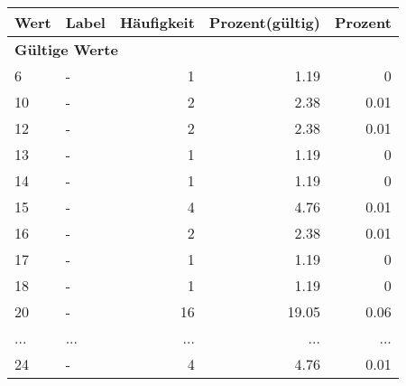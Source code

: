      \begin{longtable}{lXrrr}
     \toprule
     \textbf{Wert} & \textbf{Label} & \textbf{Häufigkeit} & \textbf{Prozent(gültig)} & \textbf{Prozent} \\
     \endhead
     \midrule
     \multicolumn{5}{l}{\textbf{Gültige Werte}}\\
        6 & \multicolumn{1}{X}{-} & %
          \num{1} &
          \num[round-mode=places,round-precision=2]{1.19} &
          \num[round-mode=places,round-precision=2]{0} \\
        10 & \multicolumn{1}{X}{-} & %
          \num{2} &
          \num[round-mode=places,round-precision=2]{2.38} &
          \num[round-mode=places,round-precision=2]{0.01} \\
        12 & \multicolumn{1}{X}{-} & %
          \num{2} &
          \num[round-mode=places,round-precision=2]{2.38} &
          \num[round-mode=places,round-precision=2]{0.01} \\
        13 & \multicolumn{1}{X}{-} & %
          \num{1} &
          \num[round-mode=places,round-precision=2]{1.19} &
          \num[round-mode=places,round-precision=2]{0} \\
        14 & \multicolumn{1}{X}{-} & %
          \num{1} &
          \num[round-mode=places,round-precision=2]{1.19} &
          \num[round-mode=places,round-precision=2]{0} \\
        15 & \multicolumn{1}{X}{-} & %
          \num{4} &
          \num[round-mode=places,round-precision=2]{4.76} &
          \num[round-mode=places,round-precision=2]{0.01} \\
        16 & \multicolumn{1}{X}{-} & %
          \num{2} &
          \num[round-mode=places,round-precision=2]{2.38} &
          \num[round-mode=places,round-precision=2]{0.01} \\
        17 & \multicolumn{1}{X}{-} & %
          \num{1} &
          \num[round-mode=places,round-precision=2]{1.19} &
          \num[round-mode=places,round-precision=2]{0} \\
        18 & \multicolumn{1}{X}{-} & %
          \num{1} &
          \num[round-mode=places,round-precision=2]{1.19} &
          \num[round-mode=places,round-precision=2]{0} \\
        20 & \multicolumn{1}{X}{-} & %
          \num{16} &
          \num[round-mode=places,round-precision=2]{19.05} &
          \num[round-mode=places,round-precision=2]{0.06} \\
       ... & ... & ... & ... & ... \\
        24 & \multicolumn{1}{X}{-} & %
          \num{4} &
          \num[round-mode=places,round-precision=2]{4.76} &
          \num[round-mode=places,round-precision=2]{0.01} \\


\end{longtable}
